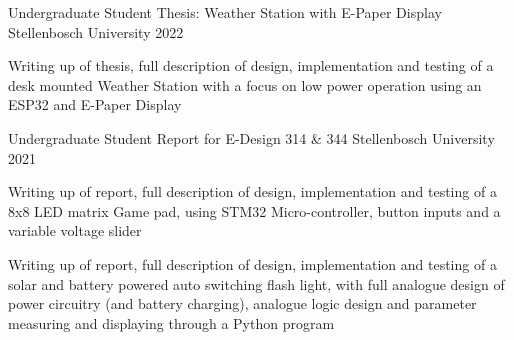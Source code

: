 

\begin{cventries}
	
  \cventry
    {Undergraduate Student} %
    {Thesis: Weather Station with E-Paper Display} %
    {Stellenbosch University} %
    {2022} %
    {
      \begin{cvitems} %
        \item {Writing up of thesis, full description of design, implementation and testing of a desk mounted Weather Station with a focus on low power operation using an ESP32 and E-Paper Display}
      \end{cvitems}
    }

  \cventry
    {Undergraduate Student} %
    {Report for E-Design 314 \& 344} %
    {Stellenbosch University} %
    {2021} %
    {
      \begin{cvitems} %
        \item {Writing up of report, full description of design, implementation and testing of a 8x8 LED matrix Game pad, using STM32 Micro-controller, button inputs and a variable voltage slider}
        \item {Writing up of report, full description of design, implementation and testing of a solar and battery powered auto switching flash light, with full analogue design of power circuitry (and battery charging), analogue logic design and parameter measuring and displaying through a Python program}
      \end{cvitems}
    }

\end{cventries}
